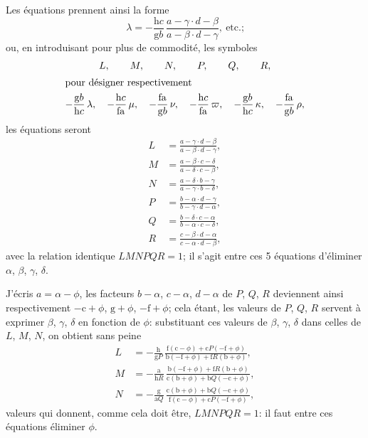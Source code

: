 \documentclass[12pt,a4paper,oneside]{book}
\theoremstyle{plain}
\theoremstyle{definition}
\theoremstyle{remark}
\begin{document}
Les \'equations prennent ainsi la forme
\[
\lambda=-\frac{\mathrm{h}c}{\mathrm{g}b}\,\frac{a-\gamma\cdot d-\beta}{a-\beta\cdot d-\gamma},\ \text{etc.;}
\]
ou, en introduisant pour plus de commodit\'e, les symboles
\begin{gather*}
L,\qquad M,\qquad N,\qquad P,\qquad Q,\qquad R,\\
\intertext{pour d\'esigner respectivement}
-\frac{\mathrm{g}b}{\mathrm{h}c}\,\lambda,\quad
-\frac{\mathrm{h}c}{\mathrm{fa}}\,\mu,\quad
-\frac{\mathrm{fa}}{\mathrm{g}b}\,\nu,\quad
-\frac{\mathrm{h}c}{\mathrm{fa}}\,\varpi,\quad
-\frac{\mathrm{g}b}{\mathrm{h}c}\,\kappa,\quad
-\frac{\mathrm{fa}}{\mathrm{g}b}\,\rho,
\end{gather*}
les \'equations seront
\begin{align*}
L&=\frac{a-\gamma\cdot d-\beta}{a-\beta\cdot d-\gamma},\\
M&=\frac{a-\beta\cdot c-\delta}{a-\delta\cdot c-\beta},\\
N&=\frac{a-\delta\cdot b-\gamma}{a-\gamma\cdot b-\delta},\\
P&=\frac{b-\alpha\cdot d-\gamma}{b-\gamma\cdot d-\alpha},\\
Q&=\frac{b-\delta\cdot c-\alpha}{b-\alpha\cdot c-\delta},\\
R&=\frac{c-\beta\cdot d-\alpha}{c-\alpha\cdot d-\beta},
\end{align*}
avec la relation identique $LMNPQR=1$; il s'agit entre ces 5 \'equations d'\'eliminer $\alpha$, $\beta$, $\gamma$, $\delta$.

J'\'ecris $a=\alpha-\phi$, les facteurs $b-\alpha$, $c-\alpha$, $d-\alpha$ de $P$, $Q$, $R$ deviennent ainsi respectivement $-\mathrm{c}+\phi$, $\mathrm{g}+\phi$, $-\mathrm{f}+\phi$; cela \'etant, les valeurs de $P$, $Q$, $R$ servent \`a exprimer $\beta$, $\gamma$, $\delta$ en fonction de $\phi$: substituant ces valeurs de $\beta$, $\gamma$, $\delta$ dans celles de $L$, $M$, $N$, on obtient sans peine
\begin{align*}
L&=-\frac{\mathrm{h}}{\mathrm{g}P}\,
  \frac{\mathrm{f}(\mathrm{c}-\phi)+\mathrm{c}P(-\mathrm{f}+\phi)}
       {\mathrm{b}(-\mathrm{f}+\phi)+\mathrm{f}R(\mathrm{b}+\phi)},\\
M&=-\frac{\mathrm{a}}{\mathrm{h}R}\,
  \frac{\mathrm{b}(-\mathrm{f}+\phi)+\mathrm{f}R(\mathrm{b}+\phi)}
       {\mathrm{c}(\mathrm{b}+\phi)+\mathrm{b}Q(-\mathrm{c}+\phi)},\\
N&=-\frac{\mathrm{g}}{\mathrm{a}Q}\,
  \frac{\mathrm{c}(\mathrm{b}+\phi)+\mathrm{b}Q(-\mathrm{c}+\phi)}
       {\mathrm{f}(\mathrm{c}-\phi)+\mathrm{c}P(-\mathrm{f}+\phi)},
\end{align*}
valeurs qui donnent, comme cela doit \^etre, $LMNPQR=1$: il faut entre ces \'equations \'eliminer $\phi$.
\end{document}
